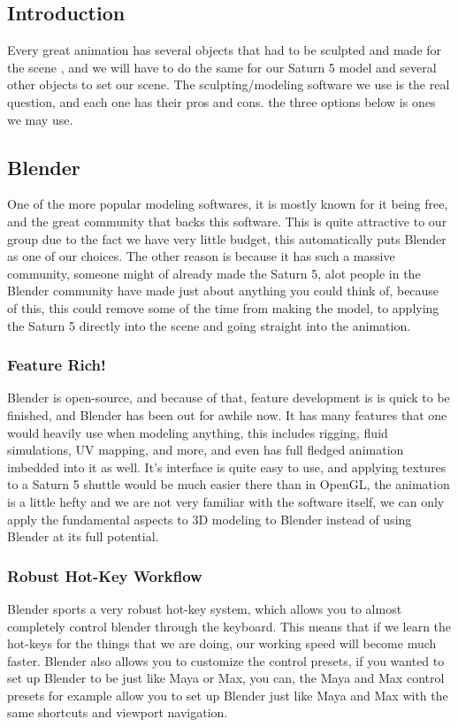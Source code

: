 \documentclass[onecolumn, draftclsnofoot,10pt, compsoc]{IEEEtran}
\begin{document}
\subsection{Introduction}
Every great animation has several objects that had to be sculpted and made for the scene , and we will have to do the same for our Saturn 5 model and several other objects to set our scene. The sculpting/modeling software we use is the real question, and each one has their pros and cons. the three options below is ones we may use.

\subsection{Blender} 
One of the more popular modeling softwares, it is mostly known for it being free, and the great community that backs this software. This is quite attractive to our group due to the fact we have very little budget, this automatically puts Blender as one of our choices. The other reason is because it has such a massive community, someone might of already made the Saturn 5, alot people in the Blender community have made just about anything you could think of, because of this, this could remove some of the time from making the model, to applying the Saturn 5 directly into the scene and going straight into the animation.
\subsubsection{Feature Rich!}
Blender is open-source, and because of that, feature development is is quick to be finished, and Blender has been out for awhile now. It has many features that one would heavily use when modeling anything, this includes rigging, fluid simulations, UV mapping, and more, and even has full fledged animation imbedded into it as well. It's interface is quite easy to use, and applying textures to a Saturn 5 shuttle would be much easier there than in OpenGL, the animation is a little hefty and we are not very familiar with the software itself, we can only apply the fundamental aspects to 3D modeling to Blender instead of using Blender at its full potential.
\subsubsection{Robust Hot-Key Workflow}
Blender sports a very robust hot-key system, which allows you to almost completely control blender through the keyboard. This means that if we learn the hot-keys for the things that we are doing, our working speed will become much faster. Blender also allows you to customize the control presets, if you wanted to set up Blender to be just like Maya or Max, you can, the Maya and Max control presets for example allow you to set up Blender just like Maya and Max with the same shortcuts and viewport navigation.
\end{document}
